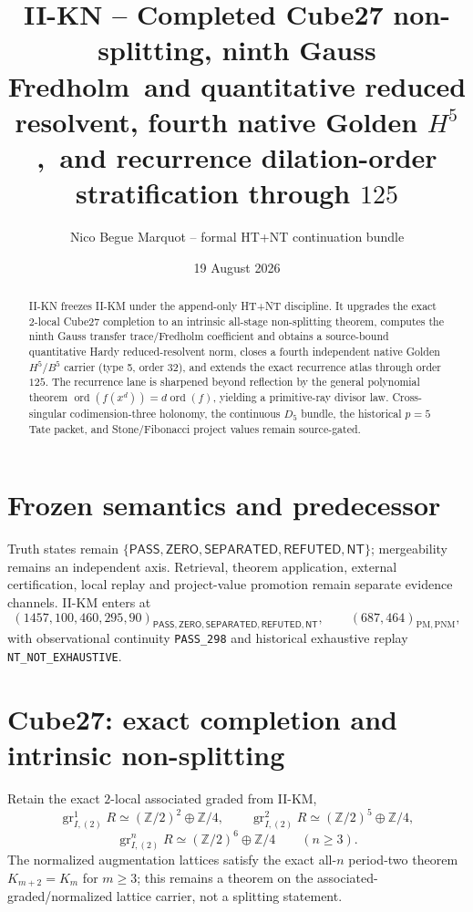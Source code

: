 \documentclass[9.5pt,a4paper]{article}
\title{\textbf{II-KN -- Completed Cube27 non-splitting, ninth Gauss Fredholm}\
\textbf{and quantitative reduced resolvent, fourth native Golden $H^5$,}\
\textbf{and recurrence dilation-order stratification through $125$}}
\author{Nico Begue Marquot -- formal HT+NT continuation bundle}\date{19 August 2026}
\newcommand{\PASS}{\textsf{PASS}}\newcommand{\ZERO}{\textsf{ZERO}}\newcommand{\SEP}{\textsf{SEPARATED}}\newcommand{\REF}{\textsf{REFUTED}}\newcommand{\NT}{\textsf{NT}}
\begin{document}
\maketitle\vspace{-1.25em}
\begin{abstract}\small
II-KN freezes II-KM under the append-only HT+NT discipline.  It upgrades the exact $2$-local Cube27 completion to an intrinsic all-stage non-splitting theorem, computes the ninth Gauss transfer trace/Fredholm coefficient and obtains a source-bound quantitative Hardy reduced-resolvent norm, closes a fourth independent native Golden $H^5/B^5$ carrier (type 5, order 32), and extends the exact recurrence atlas through order $125$.  The recurrence lane is sharpened beyond reflection by the general polynomial theorem $\operatorname{ord}(f(x^d))=d\operatorname{ord}(f)$, yielding a primitive-ray divisor law.  Cross-singular codimension-three holonomy, the continuous $D_5$ bundle, the historical $p=5$ Tate packet, and Stone/Fibonacci project values remain source-gated.
\end{abstract}

\section{Frozen semantics and predecessor}
Truth states remain $\{\PASS,\ZERO,\SEP,\REF,\NT\}$; mergeability remains an independent axis.  Retrieval, theorem application, external certification, local replay and project-value promotion remain separate evidence channels.  II-KM enters at
\[
(1457,100,460,295,90)_{\PASS,\ZERO,\SEP,\REF,\NT},\qquad
(687,464)_{\mathrm{PM},\mathrm{PNM}},
\]
with observational continuity \texttt{PASS\_298} and historical exhaustive replay \texttt{NT\_NOT\_EXHAUSTIVE}.

\section{Cube27: exact completion and intrinsic non-splitting}
Retain the exact $2$-local associated graded from II-KM,
\[
\operatorname{gr}^1_{I,(2)}R\simeq(\mathbb Z/2)^2\oplus\mathbb Z/4,\qquad
\operatorname{gr}^2_{I,(2)}R\simeq(\mathbb Z/2)^5\oplus\mathbb Z/4,
\]
\[
\boxed{\operatorname{gr}^n_{I,(2)}R\simeq(\mathbb Z/2)^6\oplus\mathbb Z/4\qquad(n\ge3).}
\]
The normalized augmentation lattices satisfy the exact all-$n$ period-two theorem $K_{m+2}=K_m$ for $m\ge3$; this remains a theorem on the associated-graded/normalized lattice carrier, not a splitting statement.
\end{document}
